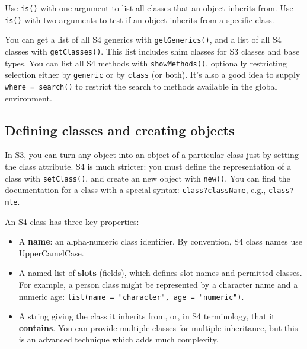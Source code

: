 Use \texttt{is()} with one argument to list all classes that an object
inherits from. Use \texttt{is()} with two arguments to test if an object
inherits from a specific class.

\begin{Shaded}
\begin{Highlighting}[]
\NormalTok{)}
\end{Highlighting}
\end{Shaded}

You can get a list of all S4 generics with \texttt{getGenerics()}, and a
list of all S4 classes with \texttt{getClasses()}. This list includes
shim classes for S3 classes and base types. You can list all S4 methods
with \texttt{showMethods()}, optionally restricting selection either by
\texttt{generic} or by \texttt{class} (or both). It's also a good idea
to supply \texttt{where = search()} to restrict the search to methods
available in the global environment.

\subsection{Defining classes and creating objects}

In S3, you can turn any object into an object of a particular class just
by setting the class attribute. S4 is much stricter: you must define the
representation of a class with \texttt{setClass()}, and create an new
object with \texttt{new()}. You can find the documentation for a class
with a special syntax: \texttt{class?className}, e.g.,
\texttt{class?mle}.  

An S4 class has three key properties:

\begin{itemize}
\item
  A \textbf{name}: an alpha-numeric class identifier. By convention, S4
  class names use UpperCamelCase.
\item
  A named list of \textbf{slots} (fields), which defines slot names and
  permitted classes. For example, a person class might be represented by
  a character name and a numeric age:
  \texttt{list(name = "character", age = "numeric")}. 
\item
  A string giving the class it inherits from, or, in S4 terminology,
  that it \textbf{contains}. You can provide multiple classes for
  multiple inheritance, but this is an advanced technique which adds
  much complexity.
\end{itemize}

